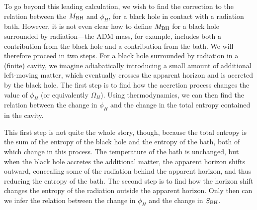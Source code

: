 To go beyond this leading calculation, we wish to find the correction to the
relation between the $M_{\rm BH}$  and $\phi_H$, for a black hole in contact
with a radiation bath.  However, it is not even clear how to define $M_{\rm
BH}$ for a black hole surrounded by radiation---the ADM mass, for example,
includes both a contribution from the black hole and a contribution from the
bath.  We will therefore proceed in two steps.  For a black hole surrounded by
radiation in a (finite) cavity, we imagine adiabatically introducing a small
amount of additional left-moving matter, which eventually crosses the apparent
horizon and is accreted by the black hole.  The first step is to find how the
accretion process changes the value of $\phi_H$ (or equivalently $\Omega_H$).
Using thermodynamics, we can then find the relation between the change in
$\phi_H$ and the change in the total entropy contained in the cavity.

This first step is not quite the whole story, though, because the total entropy
is the sum of the entropy of the black hole and the entropy of the bath, both
of which change in this process.  The temperature of the bath is unchanged, but
when the black hole accretes the additional matter, the apparent horizon shifts
outward, concealing some of the radiation behind the apparent horizon, and thus
reducing the entropy of the bath.  The second step is to find how the horizon
shift changes the entropy of the radiation outside the apparent horizon.  Only
then can we infer the relation between the change in $\phi_H$ and the change in
$S_{\rm BH}$.

